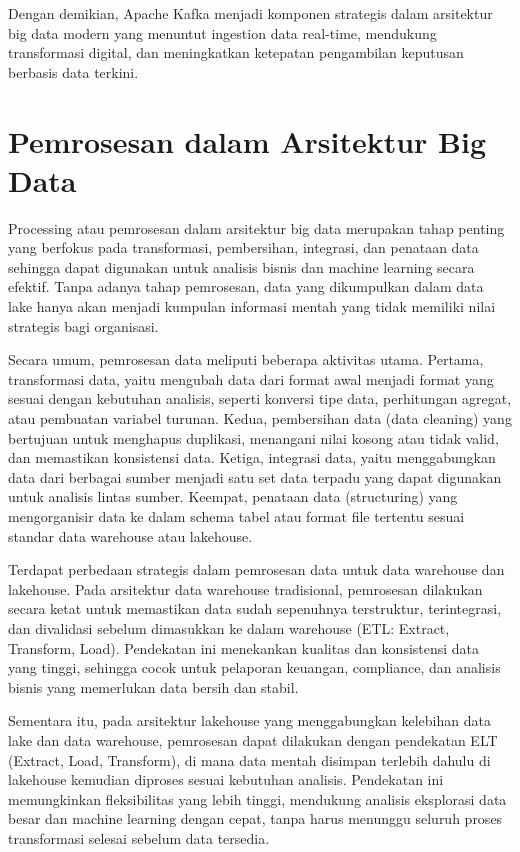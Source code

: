 Dengan demikian, Apache Kafka menjadi komponen strategis dalam arsitektur big data modern yang menuntut ingestion data real-time, mendukung transformasi digital, dan meningkatkan ketepatan pengambilan keputusan berbasis data terkini.

\section{Pemrosesan dalam Arsitektur Big Data}


Processing atau pemrosesan dalam arsitektur big data merupakan tahap penting yang berfokus pada transformasi, pembersihan, integrasi, dan penataan data sehingga dapat digunakan untuk analisis bisnis dan machine learning secara efektif. Tanpa adanya tahap pemrosesan, data yang dikumpulkan dalam data lake hanya akan menjadi kumpulan informasi mentah yang tidak memiliki nilai strategis bagi organisasi.

Secara umum, pemrosesan data meliputi beberapa aktivitas utama. Pertama, transformasi data, yaitu mengubah data dari format awal menjadi format yang sesuai dengan kebutuhan analisis, seperti konversi tipe data, perhitungan agregat, atau pembuatan variabel turunan. Kedua, pembersihan data (data cleaning) yang bertujuan untuk menghapus duplikasi, menangani nilai kosong atau tidak valid, dan memastikan konsistensi data. Ketiga, integrasi data, yaitu menggabungkan data dari berbagai sumber menjadi satu set data terpadu yang dapat digunakan untuk analisis lintas sumber. Keempat, penataan data (structuring) yang mengorganisir data ke dalam schema tabel atau format file tertentu sesuai standar data warehouse atau lakehouse.

Terdapat perbedaan strategis dalam pemrosesan data untuk data warehouse dan lakehouse. Pada arsitektur data warehouse tradisional, pemrosesan dilakukan secara ketat untuk memastikan data sudah sepenuhnya terstruktur, terintegrasi, dan divalidasi sebelum dimasukkan ke dalam warehouse (ETL: Extract, Transform, Load). Pendekatan ini menekankan kualitas dan konsistensi data yang tinggi, sehingga cocok untuk pelaporan keuangan, compliance, dan analisis bisnis yang memerlukan data bersih dan stabil.

Sementara itu, pada arsitektur lakehouse yang menggabungkan kelebihan data lake dan data warehouse, pemrosesan dapat dilakukan dengan pendekatan ELT (Extract, Load, Transform), di mana data mentah disimpan terlebih dahulu di lakehouse kemudian diproses sesuai kebutuhan analisis. Pendekatan ini memungkinkan fleksibilitas yang lebih tinggi, mendukung analisis eksplorasi data besar dan machine learning dengan cepat, tanpa harus menunggu seluruh proses transformasi selesai sebelum data tersedia.

